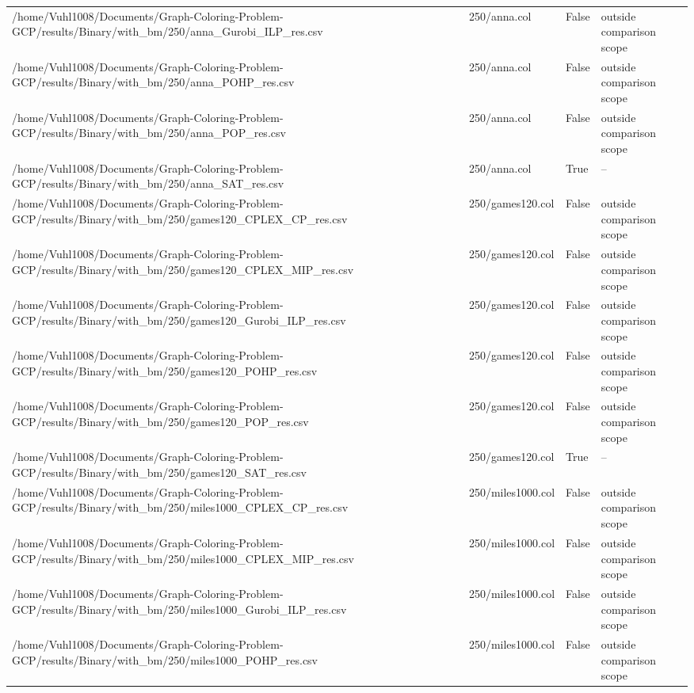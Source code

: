 \begin{table}[htbp]
\begin{tabular}{llll}
/home/Vuhl1008/Documents/Graph-Coloring-Problem-GCP/results/Binary/with\_bm/250/anna\_Gurobi\_ILP\_res.csv & 250/anna.col & False & outside comparison scope \\
/home/Vuhl1008/Documents/Graph-Coloring-Problem-GCP/results/Binary/with\_bm/250/anna\_POHP\_res.csv & 250/anna.col & False & outside comparison scope \\
/home/Vuhl1008/Documents/Graph-Coloring-Problem-GCP/results/Binary/with\_bm/250/anna\_POP\_res.csv & 250/anna.col & False & outside comparison scope \\
/home/Vuhl1008/Documents/Graph-Coloring-Problem-GCP/results/Binary/with\_bm/250/anna\_SAT\_res.csv & 250/anna.col & True & -- \\
/home/Vuhl1008/Documents/Graph-Coloring-Problem-GCP/results/Binary/with\_bm/250/games120\_CPLEX\_CP\_res.csv & 250/games120.col & False & outside comparison scope \\
/home/Vuhl1008/Documents/Graph-Coloring-Problem-GCP/results/Binary/with\_bm/250/games120\_CPLEX\_MIP\_res.csv & 250/games120.col & False & outside comparison scope \\
/home/Vuhl1008/Documents/Graph-Coloring-Problem-GCP/results/Binary/with\_bm/250/games120\_Gurobi\_ILP\_res.csv & 250/games120.col & False & outside comparison scope \\
/home/Vuhl1008/Documents/Graph-Coloring-Problem-GCP/results/Binary/with\_bm/250/games120\_POHP\_res.csv & 250/games120.col & False & outside comparison scope \\
/home/Vuhl1008/Documents/Graph-Coloring-Problem-GCP/results/Binary/with\_bm/250/games120\_POP\_res.csv & 250/games120.col & False & outside comparison scope \\
/home/Vuhl1008/Documents/Graph-Coloring-Problem-GCP/results/Binary/with\_bm/250/games120\_SAT\_res.csv & 250/games120.col & True & -- \\
/home/Vuhl1008/Documents/Graph-Coloring-Problem-GCP/results/Binary/with\_bm/250/miles1000\_CPLEX\_CP\_res.csv & 250/miles1000.col & False & outside comparison scope \\
/home/Vuhl1008/Documents/Graph-Coloring-Problem-GCP/results/Binary/with\_bm/250/miles1000\_CPLEX\_MIP\_res.csv & 250/miles1000.col & False & outside comparison scope \\
/home/Vuhl1008/Documents/Graph-Coloring-Problem-GCP/results/Binary/with\_bm/250/miles1000\_Gurobi\_ILP\_res.csv & 250/miles1000.col & False & outside comparison scope \\
/home/Vuhl1008/Documents/Graph-Coloring-Problem-GCP/results/Binary/with\_bm/250/miles1000\_POHP\_res.csv & 250/miles1000.col & False & outside comparison scope \\

\end{tabular}
\end{table}
